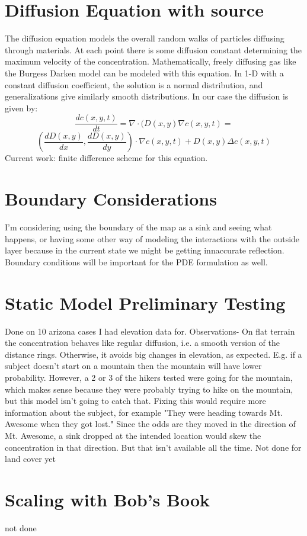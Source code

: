 \documentclass[]{article}
\begin{document}
\section{Diffusion Equation with source}
The diffusion equation models the overall random walks of particles diffusing through materials. At each point there is some diffusion constant determining the maximum velocity of the concentration. Mathematically, freely diffusing gas like the Burgess Darken model can be modeled with this equation. In 1-D with a constant diffusion coefficient, the solution is a normal distribution, and generalizations give similarly smooth distributions. In our case the diffusion is given by:
\[\frac{dc(x,y,t)}{dt}=\nabla \cdot(D(x,y)\nabla c(x,y,t)=\]
\[(\frac{dD(x,y)}{dx},\frac{dD(x,y)}{dy})\cdot\nabla c(x,y,t) + D(x,y)\Delta c(x,y,t)\]
Current work: finite difference scheme for this equation.
\section{Boundary Considerations}
I'm considering using the boundary of the map as a sink and seeing what happens, or having some other way of modeling the interactions with the outside layer because in the current state we might be getting innaccurate reflection. Boundary conditions will be important for the PDE formulation as well.

\section{Static Model Preliminary Testing}
Done on 10 arizona cases I had elevation data for. Observations- On flat terrain the concentration behaves like regular diffusion, i.e. a smooth version of the distance rings. Otherwise, it avoids big changes in elevation, as expected. E.g. if a subject doesn't start on a mountain then the mountain will have lower probability. However, a 2 or 3 of the hikers tested were going for the mountain, which makes sense because they were probably trying to hike on the mountain, but this model isn't going to catch that. Fixing this would require more information about the subject, for example "They were heading towards Mt. Awesome when they got lost." Since the odds are they moved in the direction of Mt. Awesome, a sink dropped at the intended location would skew the concentration in that direction. But that isn't available all the time.
Not done for land cover yet
\section{Scaling with Bob's Book}
not done
\end{document}
